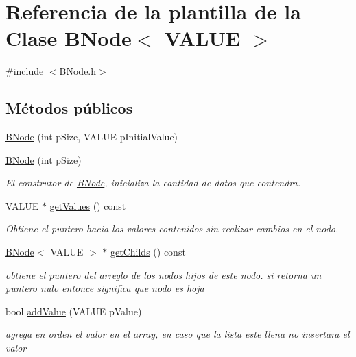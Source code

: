 \hypertarget{classBNode}{\section{Referencia de la plantilla de la Clase B\-Node$<$ V\-A\-L\-U\-E $>$}
\label{classBNode}
}


{\ttfamily \#include $<$B\-Node.\-h$>$}

\subsection*{Métodos públicos}
\begin{DoxyCompactItemize}
\item 
\hyperlink{classBNode_af01747c25c2d2fd3d13e48856b488bc9}{B\-Node} (int p\-Size, V\-A\-L\-U\-E p\-Initial\-Value)
\item 
\hyperlink{classBNode_a75ca826e991a8e57cb67748ab03aea77}{B\-Node} (int p\-Size)
\begin{DoxyCompactList}\small\item\em El construtor de \hyperlink{classBNode}{B\-Node}, inicializa la cantidad de datos que contendra. \end{DoxyCompactList}\item 
V\-A\-L\-U\-E $\ast$ \hyperlink{classBNode_a1f40c8dc96ba1c920703b40a85bef380}{get\-Values} () const 
\begin{DoxyCompactList}\small\item\em Obtiene el puntero hacia los valores contenidos sin realizar cambios en el nodo. \end{DoxyCompactList}\item 
\hyperlink{classBNode}{B\-Node}$<$ V\-A\-L\-U\-E $>$ $\ast$ \hyperlink{classBNode_a86a9053ba20c97c81a4a0f5cf370316d}{get\-Childs} () const 
\begin{DoxyCompactList}\small\item\em obtiene el puntero del arreglo de los nodos hijos de este nodo. si retorna un puntero nulo entonce significa que nodo es hoja \end{DoxyCompactList}\item 
bool \hyperlink{classBNode_aef1d184c4aeb9d85705b8917ed8e21ae}{add\-Value} (V\-A\-L\-U\-E p\-Value)
\begin{DoxyCompactList}\small\item\em agrega en orden el valor en el array, en caso que la lista este llena no insertara el valor \end{DoxyCompactList}\item 

\end{DoxyCompactItemize}
